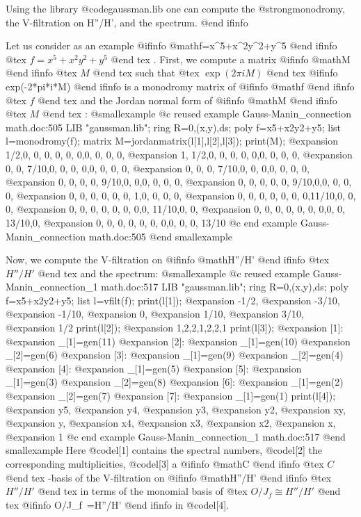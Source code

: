 Using the library @code{gaussman.lib} one can compute the @strong{monodromy}, the V-filtration on H''/H', and the spectrum.
@end ifinfo

Let us consider as an example 
@ifinfo
@math{f=x^5+x^2y^2+y^5}
@end ifinfo
@tex
$f=x^5+x^2y^2+y^5$
@end tex
.
First, we compute a matrix 
@ifinfo
@math{M}
@end ifinfo
@tex
$M$
@end tex
 such that
@tex
$\exp(2\pi iM)$
@end tex
@ifinfo
exp(-2*pi*i*M)
@end ifinfo
is a monodromy matrix of 
@ifinfo
@math{f}
@end ifinfo
@tex
$f$
@end tex
 and the Jordan normal form of 
@ifinfo
@math{M}
@end ifinfo
@tex
$M$
@end tex
:
@smallexample
@c reused example Gauss-Manin_connection math.doc:505 
  LIB "gaussman.lib";
  ring R=0,(x,y),ds;
  poly f=x5+x2y2+y5;
  list l=monodromy(f);
  matrix M=jordanmatrix(l[1],l[2],l[3]);
  print(M);
@expansion{} 1/2,0,  0,   0,   0,   0,   0,0,    0,    0,    0,   
@expansion{} 1,  1/2,0,   0,   0,   0,   0,0,    0,    0,    0,   
@expansion{} 0,  0,  7/10,0,   0,   0,   0,0,    0,    0,    0,   
@expansion{} 0,  0,  0,   7/10,0,   0,   0,0,    0,    0,    0,   
@expansion{} 0,  0,  0,   0,   9/10,0,   0,0,    0,    0,    0,   
@expansion{} 0,  0,  0,   0,   0,   9/10,0,0,    0,    0,    0,   
@expansion{} 0,  0,  0,   0,   0,   0,   1,0,    0,    0,    0,   
@expansion{} 0,  0,  0,   0,   0,   0,   0,11/10,0,    0,    0,   
@expansion{} 0,  0,  0,   0,   0,   0,   0,0,    11/10,0,    0,   
@expansion{} 0,  0,  0,   0,   0,   0,   0,0,    0,    13/10,0,   
@expansion{} 0,  0,  0,   0,   0,   0,   0,0,    0,    0,    13/10
@c end example Gauss-Manin_connection math.doc:505
@end smallexample

Now, we compute the V-filtration on 
@ifinfo
@math{H''/H'}
@end ifinfo
@tex
$H''/H'$
@end tex
 and the spectrum:
@smallexample
@c reused example Gauss-Manin_connection_1 math.doc:517 
  LIB "gaussman.lib";
  ring R=0,(x,y),ds;
  poly f=x5+x2y2+y5;
  list l=vfilt(f);
  print(l[1]);
@expansion{} -1/2,
@expansion{} -3/10,
@expansion{} -1/10,
@expansion{} 0,
@expansion{} 1/10,
@expansion{} 3/10,
@expansion{} 1/2
  print(l[2]);
@expansion{} 1,2,2,1,2,2,1
  print(l[3]);
@expansion{} [1]:
@expansion{}    _[1]=gen(11)
@expansion{} [2]:
@expansion{}    _[1]=gen(10)
@expansion{}    _[2]=gen(6)
@expansion{} [3]:
@expansion{}    _[1]=gen(9)
@expansion{}    _[2]=gen(4)
@expansion{} [4]:
@expansion{}    _[1]=gen(5)
@expansion{} [5]:
@expansion{}    _[1]=gen(3)
@expansion{}    _[2]=gen(8)
@expansion{} [6]:
@expansion{}    _[1]=gen(2)
@expansion{}    _[2]=gen(7)
@expansion{} [7]:
@expansion{}    _[1]=gen(1)
  print(l[4]);
@expansion{} y5,
@expansion{} y4,
@expansion{} y3,
@expansion{} y2,
@expansion{} xy,
@expansion{} y,
@expansion{} x4,
@expansion{} x3,
@expansion{} x2,
@expansion{} x,
@expansion{} 1
@c end example Gauss-Manin_connection_1 math.doc:517
@end smallexample
Here @code{l[1]} contains the spectral numbers, @code{l[2]} the corresponding multiplicities, @code{l[3]} a 
@ifinfo
@math{C}
@end ifinfo
@tex
$C$
@end tex
-basis of the V-filtration on 
@ifinfo
@math{H''/H'}
@end ifinfo
@tex
$H''/H'$
@end tex
 in terms of the monomial basis of
@tex
$O/J_f\cong H''/H'$
@end tex
@ifinfo
O/J_f~=H''/H' 
@end ifinfo
in @code{l[4]}.

